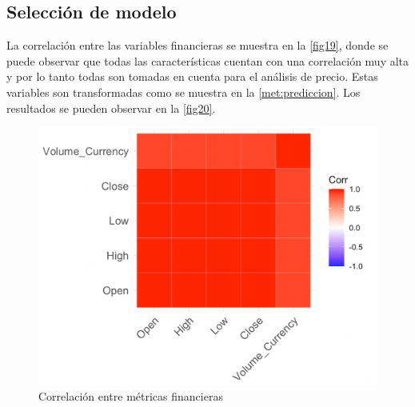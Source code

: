 \subsection{Selección de modelo}

La correlación entre las variables financieras se muestra en la \autoref{fig19}, donde se puede observar que todas las características cuentan con una correlación muy alta y por lo tanto todas son tomadas en cuenta para el análisis de precio. Estas variables son transformadas como se muestra en la \autoref{met:prediccion}. Los resultados se pueden observar en la \autoref{fig20}. 

\begin{figure}[h!]
	\centering
	\includegraphics[scale=0.5]{Chapter5/finance_corr.png}
	\caption{Correlación entre métricas financieras}
	\label{fig19}
\end{figure}

